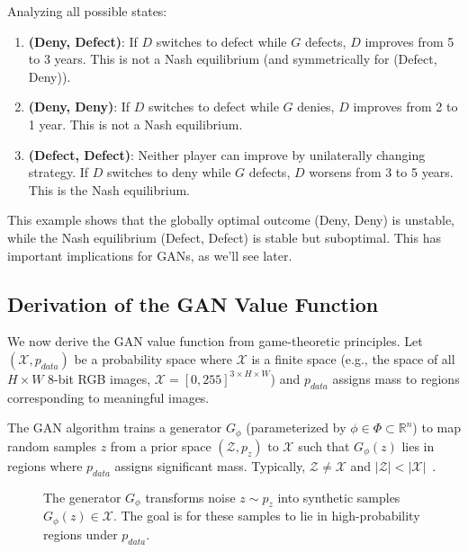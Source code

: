 Analyzing all possible states:
\begin{enumerate}
  \item \textbf{(Deny, Defect)}: If $D$ switches to defect while $G$ defects, $D$ improves from 5 to 3 years. This is not a Nash equilibrium (and symmetrically for (Defect, Deny)).

  \item \textbf{(Deny, Deny)}: If $D$ switches to defect while $G$ denies, $D$ improves from 2 to 1 year. This is not a Nash equilibrium.

  \item \textbf{(Defect, Defect)}: Neither player can improve by unilaterally changing strategy. If $D$ switches to deny while $G$ defects, $D$ worsens from 3 to 5 years. This is the Nash equilibrium.
\end{enumerate}

This example shows that the globally optimal outcome (Deny, Deny) is unstable, while the Nash equilibrium (Defect, Defect) is stable but suboptimal. This has important implications for GANs, as we'll see later.

\subsection{Derivation of the GAN Value Function}%
\label{sec:derivation}

We now derive the GAN value function from game-theoretic principles. Let $(\mathcal{X}, p_{data})$ be a probability space where $\mathcal{X}$ is a finite space (e.g., the space of all $H \times W$ 8-bit RGB images, $\mathcal{X} = [0, 255]^{3 \times H \times W}$) and $p_{data}$ assigns mass to regions corresponding to meaningful images.

The GAN algorithm trains a generator $G_\phi$ (parameterized by $\phi \in \Phi \subset \mathbb{R}^n$) to map random samples $z$ from a prior space $(\mathcal{Z}, p_z)$ to $\mathcal{X}$ such that $G_\phi(z)$ lies in regions where $p_{data}$ assigns significant mass. Typically, $\mathcal{Z} \neq \mathcal{X}$ and $|\mathcal{Z}| < |\mathcal{X}|$~\cite{ref:arjovsky-2017}.

\begin{figure}[H]
  \centering
  \caption{The generator $G_\phi$ transforms noise $z \sim p_z$ into synthetic samples $G_\phi(z) \in \mathcal{X}$. The goal is for these samples to lie in high-probability regions under $p_{data}$.}%
  \label{fig:g-maps}
\end{figure}

